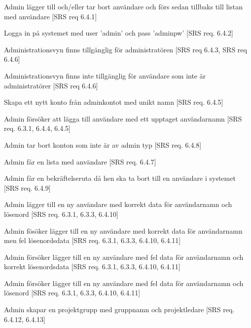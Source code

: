 \documentclass[a4paper]{article}
\begin{document}
\begin{appendices}
\begin{FT}
\item
Admin lägger till och/eller tar bort användare och förs sedan tillbaks till listan med användare [SRS req 6.4.1]

\item 

Logga in på systemet med user 'admin' och pass 'adminpw' [SRS req. 6.4.2]

\item 
Administrationsvyn finns tillgänglig för administratören [SRS req 6.4.3, SRS req 6.4.6]

\item
Administrationsvyn finns inte tillgänglig för användare som inte är administratörer [SRS req 6.4.6]

\item
Skapa ett nytt konto från adminkontot med unikt namn [SRS req. 6.4.5]


\item
Admin försöker att lägga till användare med ett upptaget användarnamn [SRS req. 6.3.1, 6.4.4, 6.4.5]

\item
Admin tar bort konton som inte är av admin typ [SRS req. 6.4.8]



\item
Admin får en lista med användare [SRS req. 6.4.7]

\item
Admin får en bekräftelseruta då hen ska ta bort till en användare i systemet [SRS req. 6.4.9]

\item
Admin lägger till en ny användare med korrekt data för användarnamn och lösenord [SRS req. 6.3.1, 6.3.3, 6.4.10]

\item
Admin fösöker lägger till en ny användare med korrekt data för användarnamn men fel lösenordsdata [SRS req. 6.3.1, 6.3.3, 6.4.10, 6.4.11]

\item
Admin försöker lägger till en ny användare med fel data för användarnamn och korrekt lösenordsdata [SRS req. 6.3.1, 6.3.3, 6.4.10, 6.4.11]

\item
Admin försöker lägger till en ny användare med fel data för användarnamn och lösenord [SRS req. 6.3.1, 6.3.3, 6.4.10, 6.4.11]

\item 
Admin skapar en projektgrupp med gruppnamn och projektledare [SRS req. 6.4.12, 6.4.13]


\end{FT}
\end{appendices}
\end{document}
